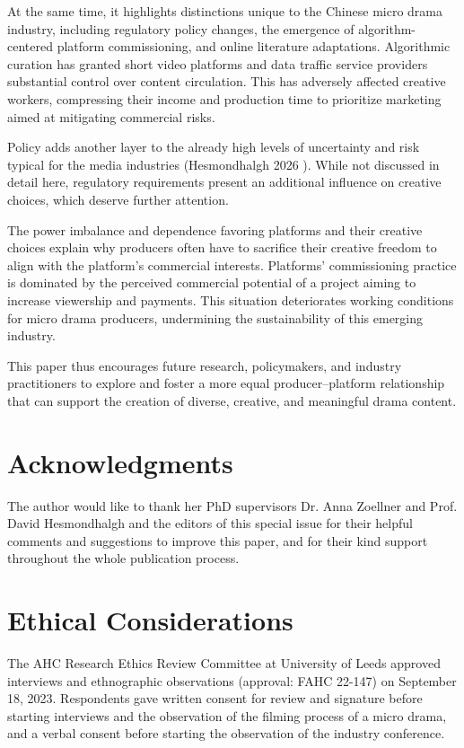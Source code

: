 \documentclass[10pt,a4paper]{article}
\begin{document}
At the same time, it highlights distinctions unique to the Chinese micro drama industry, including regulatory policy changes, the emergence of algorithm-centered platform commissioning, and online literature adaptations. Algorithmic curation has granted short video platforms and data traffic service providers substantial control over content circulation. This has adversely affected creative workers, compressing their income and production time to prioritize marketing aimed at mitigating commercial risks.\par
Policy adds another layer to the already high levels of uncertainty and risk typical for the media industries (Hesmondhalgh 2026 ). While not discussed in detail here, regulatory requirements present an additional influence on creative choices, which deserve further attention.\par
The power imbalance and dependence favoring platforms and their creative choices explain why producers often have to sacrifice their creative freedom to align with the platform’s commercial interests. Platforms’ commissioning practice is dominated by the perceived commercial potential of a project aiming to increase viewership and payments. This situation deteriorates working conditions for micro drama producers, undermining the sustainability of this emerging industry.\par
This paper thus encourages future research, policymakers, and industry practitioners to explore and foster a more equal producer–platform relationship that can support the creation of diverse, creative, and meaningful drama content.\par
\section*{Acknowledgments}
The author would like to thank her PhD supervisors Dr. Anna Zoellner and Prof. David Hesmondhalgh and the editors of this special issue for their helpful comments and suggestions to improve this paper, and for their kind support throughout the whole publication process.\par
\section*{Ethical Considerations}
The AHC Research Ethics Review Committee at University of Leeds approved interviews and ethnographic observations (approval: FAHC 22-147) on September 18, 2023. Respondents gave written consent for review and signature before starting interviews and the observation of the filming process of a micro drama, and a verbal consent before starting the observation of the industry conference.\par
\end{document}

